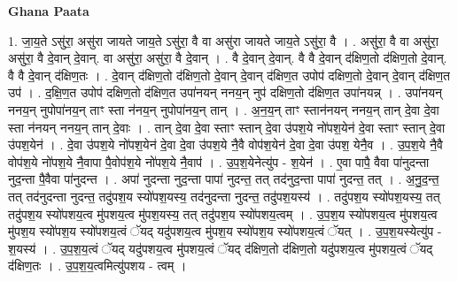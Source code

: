 \documentclass[17pt]{extarticle}
\begin{document}
\textbf{Ghana Paata } \newline

1. जा॒य॒ते ऽसु॑रा॒ असु॑रा जायते जाय॒ते ऽसु॑रा॒ वै वा असु॑रा जायते जाय॒ते ऽसु॑रा॒ वै । . असु॑रा॒ वै वा असु॑रा॒ असु॑रा॒ वै दे॒वान् दे॒वान्. वा असु॑रा॒ असु॑रा॒ वै दे॒वान् । . वै दे॒वान् दे॒वान्. वै वै दे॒वान् द॑क्षिण॒तो द॑क्षिण॒तो दे॒वान्. वै वै दे॒वान् द॑क्षिण॒तः । . दे॒वान् द॑क्षिण॒तो द॑क्षिण॒तो दे॒वान् दे॒वान् द॑क्षिण॒त उपोप॑ दक्षिण॒तो दे॒वान् दे॒वान् द॑क्षिण॒त उप॑ । . द॒क्षि॒ण॒त उपोप॑ दक्षिण॒तो द॑क्षिण॒त उपा॑नयन् ननय॒न् नुप॑ दक्षिण॒तो द॑क्षिण॒त उपा॑नयन्न् । . उपा॑नयन् ननय॒न् नुपोपा॑नय॒न् ताꣳ स्ता न॑नय॒न् नुपोपा॑नय॒न् तान् । . अ॒न॒य॒न् ताꣳ स्तान॑नयन् ननय॒न् तान् दे॒वा दे॒वा स्ता न॑नयन् ननय॒न् तान् दे॒वाः । . तान् दे॒वा दे॒वा स्ताꣳ स्तान् दे॒वा उ॑पश॒ये नो॑पश॒येन॑ दे॒वा स्ताꣳ स्तान् दे॒वा उ॑पश॒येन॑ । . दे॒वा उ॑पश॒ये नो॑पश॒येन॑ दे॒वा दे॒वा उ॑पश॒ये नै॒वै वोप॑श॒येन॑ दे॒वा दे॒वा उ॑पश॒ येनै॒व । . उ॒प॒श॒ये नै॒वै वोप॑श॒ये नो॑पश॒ये नै॒वापा पै॒वोप॑श॒ये नो॑पश॒ये नै॒वाप॑ । . उ॒प॒श॒येनेत्यु॑प - श॒येन॑ । . ए॒वा पापै॒ वैवा पा॑नुदन्ता नुद॒न्ता पै॒वैवा पा॑नुदन्त । . अपा॑ नुदन्ता नुद॒न्ता पापा॑ नुदन्त॒ तत् तद॑नुद॒न्ता पापा॑ नुदन्त॒ तत् । . अ॒नु॒द॒न्त॒ तत् तद॑नुदन्ता नुदन्त॒ तदु॑पश॒य स्यो॑पश॒यस्य॒ तद॑नुदन्ता नुदन्त॒ तदु॑पश॒यस्य॑ । . तदु॑पश॒य स्यो॑पश॒यस्य॒ तत् तदु॑पश॒य स्यो॑पशय॒त्व मु॑पशय॒त्व मु॑पश॒यस्य॒ तत् तदु॑पश॒य स्यो॑पशय॒त्वम् । . उ॒प॒श॒य स्यो॑पशय॒त्व मु॑पशय॒त्व मु॑पश॒य स्यो॑पश॒य स्यो॑पशय॒त्वं ॅयद् यदु॑पशय॒त्व मु॑पश॒य स्यो॑पश॒य स्यो॑पशय॒त्वं ॅयत् । . उ॒प॒श॒यस्येत्यु॑प - श॒यस्य॑ । . उ॒प॒श॒य॒त्वं ॅयद् यदु॑पशय॒त्व मु॑पशय॒त्वं ॅयद् द॑क्षिण॒तो द॑क्षिण॒तो यदु॑पशय॒त्व मु॑पशय॒त्वं ॅयद् द॑क्षिण॒तः । . उ॒प॒श॒य॒त्वमित्यु॑पशय - त्वम् । \newline
\end{document}
